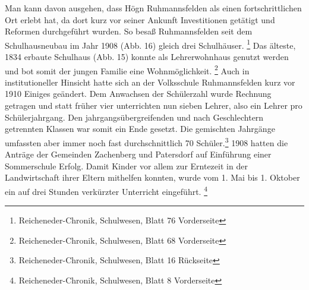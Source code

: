 \documentclass[a4paper]{article}
\newcounter{Abb}
\begin{document}
Man kann davon ausgehen, dass Högn Ruhmannsfelden als einen
fortschrittlichen Ort erlebt hat, da dort kurz vor seiner Ankunft
Investitionen getätigt und Reformen durchgeführt wurden. So besaß
Ruhmannsfelden seit dem Schulhausneubau im Jahr 1908 (Abb. 16) gleich
drei Schulhäuser. \footnote{Reicheneder-Chronik, Schulwesen, Blatt 76
Vorderseite} Das älteste, 1834 erbaute Schulhaus (Abb. 15) konnte als
Lehrerwohnhaus genutzt werden und bot somit der jungen Familie eine
Wohnmöglichkeit. \footnote{Reicheneder-Chronik, Schulwesen, Blatt 68
Vorderseite} Auch in institutioneller Hinsicht hatte sich an der
Volksschule Ruhmannsfelden kurz vor 1910 Einiges geändert. Dem
Anwachsen der Schülerzahl wurde Rechnung getragen und statt früher vier
unterrichten nun sieben Lehrer, also ein Lehrer pro Schülerjahrgang.
Den jahrgangsübergreifenden und nach Geschlechtern getrennten Klassen
war somit ein Ende gesetzt. Die gemischten Jahrgänge umfassten aber
immer noch fast durchschnittlich 70 Schüler.\footnote{
Reicheneder-Chronik, Schulwesen, Blatt 16 Rückseite} 1908 hatten die
Anträge der Gemeinden Zachenberg und Patersdorf auf Einführung einer
Sommerschule Erfolg. Damit Kinder vor allem zur Erntezeit in der
Landwirtschaft ihrer Eltern mithelfen konnten, wurde vom 1. Mai bis 1.
Oktober ein auf drei Stunden verkürzter Unterricht
eingeführt. \footnote{Reicheneder-Chronik, Schulwesen, Blatt 8
Vorderseite}
\end{document}
